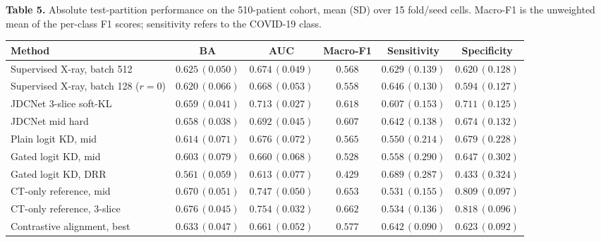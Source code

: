 \documentclass[pdflatex,sn-vancouver,Numbered]{sn-jnl}
\begin{document}
\begin{minipage}{\textwidth}
{\small\noindent\textbf{Table 5.} Absolute test-partition performance on the 510-patient cohort, mean (SD) over 15 fold/seed cells. Macro-F1 is the unweighted mean of the per-class F1 scores; sensitivity refers to the COVID-19 class.\par}
\vspace{6pt}


\centering
\scriptsize
\setlength{\tabcolsep}{2.2pt}
\renewcommand{\arraystretch}{0.9}
\begin{tabularx}{\textwidth}{@{}>{\raggedright\arraybackslash}Xccccc@{}}
\toprule
Method & BA & AUC & Macro-F1 & Sensitivity & Specificity \\
\midrule
Supervised X-ray, batch 512 & $0.625\,(0.050)$ & $0.674\,(0.049)$ & $0.568$ & $0.629\,(0.139)$ & $0.620\,(0.128)$ \\
Supervised X-ray, batch 128 ($r{=}0$) & $0.620\,(0.066)$ & $0.668\,(0.053)$ & $0.558$ & $0.646\,(0.130)$ & $0.594\,(0.127)$ \\
JDCNet 3-slice soft-KL & $0.659\,(0.041)$ & $0.713\,(0.027)$ & $0.618$ & $0.607\,(0.153)$ & $0.711\,(0.125)$ \\
JDCNet mid hard & $0.658\,(0.038)$ & $0.692\,(0.045)$ & $0.607$ & $0.642\,(0.138)$ & $0.674\,(0.132)$ \\
Plain logit KD, mid & $0.614\,(0.071)$ & $0.676\,(0.072)$ & $0.565$ & $0.550\,(0.214)$ & $0.679\,(0.228)$ \\
Gated logit KD, mid & $0.603\,(0.079)$ & $0.660\,(0.068)$ & $0.528$ & $0.558\,(0.290)$ & $0.647\,(0.302)$ \\
Gated logit KD, DRR & $0.561\,(0.059)$ & $0.613\,(0.077)$ & $0.429$ & $0.689\,(0.287)$ & $0.433\,(0.324)$ \\
CT-only reference, mid & $0.670\,(0.051)$ & $0.747\,(0.050)$ & $0.653$ & $0.531\,(0.155)$ & $0.809\,(0.097)$ \\
CT-only reference, 3-slice & $0.676\,(0.045)$ & $0.754\,(0.032)$ & $0.662$ & $0.534\,(0.136)$ & $0.818\,(0.096)$ \\
Contrastive alignment, best & $0.633\,(0.047)$ & $0.661\,(0.052)$ & $0.577$ & $0.642\,(0.090)$ & $0.623\,(0.092)$ \\
\bottomrule
\end{tabularx}
\end{minipage}
\clearpage
\end{document}

